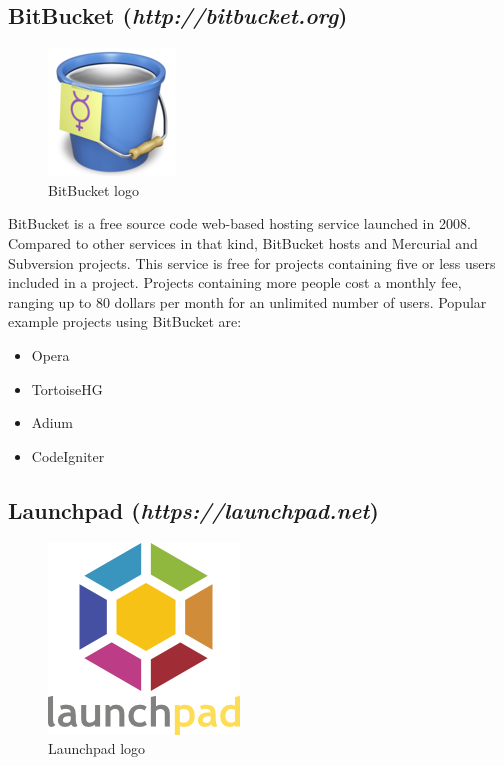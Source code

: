 \subsection{BitBucket (\textit{http://bitbucket.org})}
\begin{figure}[h]
  \centering 
  \includegraphics{img/bitbucket}
  \caption{BitBucket logo}
  \label{}
\end{figure}
BitBucket is a free source code web-based hosting service launched in 2008. Compared to other services in that kind, BitBucket hosts and Mercurial and Subversion projects. This service is free for projects containing five or less users included in a project. Projects containing more people cost a monthly fee, ranging up to 80 dollars per month for an unlimited number of users.
\newline
Popular example projects using BitBucket are:

\begin{itemize}
	\item Opera
	\item TortoiseHG
	\item Adium
	\item CodeIgniter
\end{itemize}

\subsection{Launchpad (\textit{https://launchpad.net})}
\begin{figure}[h]
  \centering 
  \includegraphics{img/launchpad}
  \caption{Launchpad logo}
  \label{}
\end{figure}

